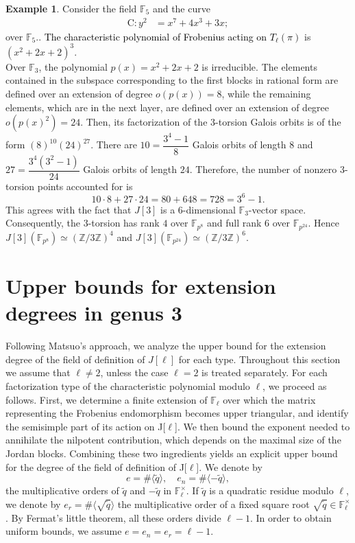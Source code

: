 \documentclass[11pt,a4paper]{article}
\theoremstyle{plain}
\theoremstyle{definition}
\newtheorem{example}[theorem]{Example}
\theoremstyle{remark}
\newcommand{\verde}[1]{\textcolor{black}{#1}}
\newcommand\C{\mathrm{C}}
\begin{document}
\begin{example}\label{examplew}
Consider the field $\mathbb{F}_5$ and the curve %
\begin{align*}
\C : y^2&= x^7 + 4x^3 + 3x;
\end{align*} 
over $\mathbb{F}_5.$. \verde {The characteristic polynomial of Frobenius acting on $T_{\ell}(\pi)$} is $(x^2+2x+2)^3$. \\
Over $\mathbb{F}_3$, the polynomial
$p(x)=x^2+2x+2$ is irreducible.
The elements contained in the subspace corresponding to the first blocks in rational form are defined over an extension of degree $o(p(x)) = 8$, while the remaining elements, which are in the next layer, are defined over an extension of degree $o(p(x)^2) = 24$.
Then, its factorization of the 3-torsion Galois orbits
is of the form $(8)^{10}(24)^{27}$. 
There are $10=\dfrac{3^4-1}{8}$ Galois orbits of length $8$ and $27=\dfrac{3^4(3^2-1)}{24}$ Galois orbits of length
$24$. Therefore, the number of nonzero $3$-torsion points accounted for is
\[
10\cdot 8 + 27\cdot 24 = 80+648=728=3^6-1.
\]
This agrees with the fact that $J[3]$ is a $6$-dimensional
$\mathbb F_3$-vector space.
Consequently, the $3$-torsion has rank $4$ over $\mathbb F_{p^8}$ and full
rank $6$ over $\mathbb F_{p^{24}}$. Hence $J[3](\mathbb F_{p^8})\simeq (\mathbb Z/3\mathbb Z)^4$ and 
$J[3](\mathbb F_{p^{24}})\simeq (\mathbb Z/3\mathbb Z)^6.$
\end{example}

\section{Upper bounds for extension degrees in genus 3}




Following Matsuo’s approach, we analyze the upper bound for the extension degree of the field of definition of \(J[\ell]\) for each type.
Throughout this section we assume that $\ell\neq 2$, unless the case $\ell=2$ is treated separately. For each factorization type of the characteristic polynomial modulo $\ell$, we proceed as follows.
First, we determine a finite extension of $\mathbb{F}_\ell$ over which the matrix representing the Frobenius endomorphism becomes upper triangular, and identify the semisimple part of its action on  J[$\ell$].
We then bound the exponent needed to annihilate the nilpotent contribution, which depends on the maximal size of the Jordan blocks.
Combining these two ingredients yields an explicit upper bound for the degree of the field of definition of J[$\ell$].
 We denote by
\[
e = \#\langle \tilde{q} \rangle,\quad
e_n = \#\langle -\tilde{q} \rangle,
\]
the multiplicative orders of $\tilde q$ and $-\tilde q$ in
$\mathbb F_\ell^\times$.
If $\tilde q$ is a quadratic residue modulo $\ell$, we denote by $e_r=\#\langle\sqrt{\tilde q}\rangle$
the multiplicative order of a fixed square root
$\sqrt{\tilde q}\in\mathbb F_\ell^\times$.
By Fermat's little theorem, all these orders divide $\ell - 1$.
In order to obtain uniform bounds, we  assume
$e = e_n = e_r = \ell - 1$.
\end{document}
